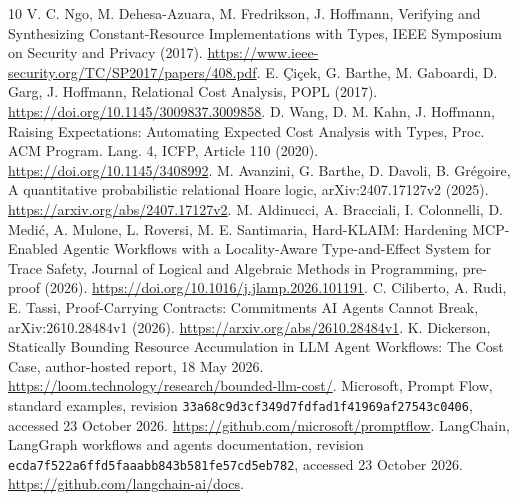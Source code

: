 \documentclass[preprint,12pt,a4paper]{elsarticle}
\begin{document}
\begin{thebibliography}{10}
 V. C. Ngo, M. Dehesa-Azuara, M. Fredrikson, J. Hoffmann,
Verifying and Synthesizing Constant-Resource Implementations with Types,
IEEE Symposium on Security and Privacy (2017).
\url{https://www.ieee-security.org/TC/SP2017/papers/408.pdf}.
 E. \c{C}i\c{c}ek, G. Barthe, M. Gaboardi, D. Garg, J. Hoffmann,
Relational Cost Analysis, POPL (2017). \url{https://doi.org/10.1145/3009837.3009858}.
 D. Wang, D. M. Kahn, J. Hoffmann, Raising Expectations:
Automating Expected Cost Analysis with Types, Proc. ACM Program. Lang. 4,
ICFP, Article 110 (2020). \url{https://doi.org/10.1145/3408992}.
 M. Avanzini, G. Barthe, D. Davoli, B. Gr\'egoire,
A quantitative probabilistic relational Hoare logic, arXiv:2407.17127v2 (2025).
\url{https://arxiv.org/abs/2407.17127v2}.
 M. Aldinucci, A. Bracciali, I. Colonnelli, D. Medi\'c,
A. Mulone, L. Roversi, M. E. Santimaria, Hard-KLAIM: Hardening MCP-Enabled
Agentic Workflows with a Locality-Aware Type-and-Effect System for Trace Safety,
Journal of Logical and Algebraic Methods in Programming, pre-proof (2026).
\url{https://doi.org/10.1016/j.jlamp.2026.101191}.
 C. Ciliberto, A. Rudi, E. Tassi, Proof-Carrying Contracts:
Commitments AI Agents Cannot Break, arXiv:2610.28484v1 (2026).
\url{https://arxiv.org/abs/2610.28484v1}.
 K. Dickerson, Statically Bounding Resource Accumulation in LLM
Agent Workflows: The Cost Case, author-hosted report, 18 May 2026.
\url{https://loom.technology/research/bounded-llm-cost/}.
 Microsoft, Prompt Flow, standard examples, revision
\nolinkurl{33a68c9d3cf349d7fdfad1f41969af27543c0406}, accessed 23 October 2026.
\url{https://github.com/microsoft/promptflow}.
 LangChain, LangGraph workflows and agents documentation,
revision \nolinkurl{ecda7f522a6ffd5faaabb843b581fe57cd5eb782}, accessed 23 October 2026.
\url{https://github.com/langchain-ai/docs}.
\end{thebibliography}
\end{document}
